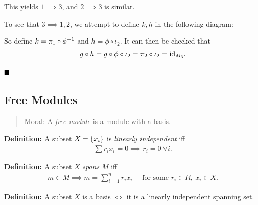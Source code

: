 This yields \(1 \implies 3\), and \(2 \implies 3\) is similar.

To see that \(3 \implies 1, 2\), we attempt to define \(k, h\) in the
following diagram:

\begin{center}
\end{center}

So define \(k = \pi_1 \circ \phi^{-1}\) and \(h = \phi \circ \iota_2\).
It can then be checked that
\begin{align*}
g \circ h = g \circ \phi \circ \iota_2 = \pi_2 \circ \iota_2 = \text{id}_{M_3}
.\end{align*}

\(\qed\)

\hypertarget{free-modules}{%
\subsection{Free Modules}\label{free-modules}}

\begin{quote}
Moral: A \emph{free module} is a module with a basis.
\end{quote}

\textbf{Definition:} A subset \(X = \left\{{x_i}\right\}\) is \emph{linearly
independent} iff
\begin{align*}
\sum r_i x_i = 0 \implies r_i = 0 ~\forall i
.\end{align*}

\textbf{Definition:} A subset \(X\) \emph{spans} \(M\) iff
\begin{align*}
m\in M \implies m = \sum_{i=1}^n r_i x_i \quad \text{ for some }r_i \in R,~x_i \in X
.\end{align*}

\textbf{Definition:} A subset \(X\) is a basis \(\iff\) it is a linearly
independent spanning set.

